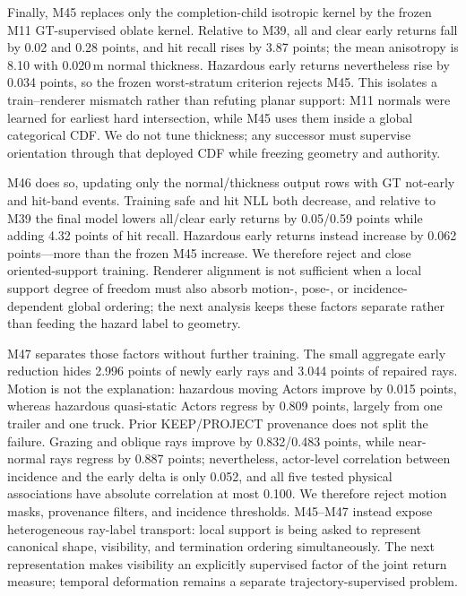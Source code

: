 Finally, M45 replaces only the completion-child isotropic kernel by the frozen M11 GT-supervised oblate kernel. Relative
to M39, all and clear early returns fall by 0.02 and 0.28 points, and hit recall rises by 3.87 points; the mean anisotropy
is 8.10 with 0.020\,m normal thickness. Hazardous early returns nevertheless rise by 0.034 points, so the frozen
worst-stratum criterion rejects M45. This isolates a train--renderer mismatch rather than refuting planar support: M11
normals were learned for earliest hard intersection, while M45 uses them inside a global categorical CDF. We do not tune
thickness; any successor must supervise orientation through that deployed CDF while freezing geometry and authority.

M46 does so, updating only the normal/thickness output rows with GT not-early and hit-band events. Training safe and hit
NLL both decrease, and relative to M39 the final model lowers all/clear early returns by 0.05/0.59 points while adding
4.32 points of hit recall. Hazardous early returns instead increase by 0.062 points---more than the frozen M45 increase.
We therefore reject and close oriented-support training. Renderer alignment is not sufficient when a local support degree
of freedom must also absorb motion-, pose-, or incidence-dependent global ordering; the next analysis keeps these factors
separate rather than feeding the hazard label to geometry.

M47 separates those factors without further training. The small aggregate early reduction hides 2.996 points of newly
early rays and 3.044 points of repaired rays. Motion is not the explanation: hazardous moving Actors improve by 0.015
points, whereas hazardous quasi-static Actors regress by 0.809 points, largely from one trailer and one truck. Prior
KEEP/PROJECT provenance does not split the failure. Grazing and oblique rays improve by 0.832/0.483 points, while
near-normal rays regress by 0.887 points; nevertheless, actor-level correlation between incidence and the early delta is
only 0.052, and all five tested physical associations have absolute correlation at most 0.100. We therefore reject
motion masks, provenance filters, and incidence thresholds. M45--M47 instead expose heterogeneous ray-label transport:
local support is being asked to represent canonical shape, visibility, and termination ordering simultaneously. The next
representation makes visibility an explicitly supervised factor of the joint return measure; temporal deformation remains
a separate trajectory-supervised problem.

